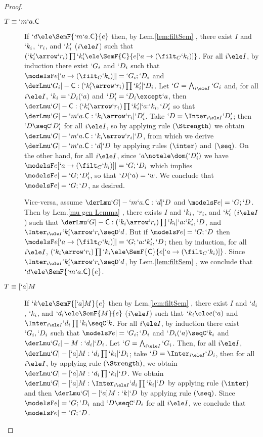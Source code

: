\documentclass{lmcs}
\begin{document}
\begin{proof}
\begin{description}
 \item [$ T\equiv `m`a.\textrm{\sf C} $] 
If $`d \ele \SemF { `m`a.\Cmd}{ e }$ then, by Lem.\skp\ref{lem:filtSem}%
, there exist $I$ and $`k_i$, $`r_i$, and $`k'_i$ ($i \ele I$) such that $(`k'_i\arrow `r_i)\prod `k'_i \ele \SemF { \Cmd}{ e[`a\to (\filt_C `k_i)] }$. 
For all $i \ele I$, by induction there exist $`G_i$ and $`D_i$ 
such that $\modelsF e[`a\to (\filt_C `k_i)] |= `G_i;`D_i$ and $ \derLmu `G_i |- {\Cmd} : (`k'_i\arrow `r_i)\prod `k'_i | `D_i $. 
Let $`G=\bigwedge_{i\ele I}`G_i$ and, for all $i \ele I$, $`k_i = `D_i(`a)$ and $`D'_i = `D_i\except`a$, then $ \derLmu `G |- {\Cmd} : (`k'_i\arrow `r_i)\prod `k'_i | `a{:}`k_i,`D'_i $ so that $ \derLmu `G |- `m`a.{\Cmd} : `k_i\arrow `r_i | `D'_i $. 
Take $`D = \Inter_{i \ele I} `D'_i$; then $`D\seqC `D'_i$ for all $i \ele I$, so by applying rule $(\Strength)$ we obtain $ \derLmu `G |- {`m`a.\Cmd} : `k_i\arrow `r_i | `D $, from which we derive $ \derLmu `G |- {`m`a.\Cmd} : `d | `D $ by applying rules $(\inter)$ and $(\seq)$.
On the other hand, for all $i \ele I$, since $`a\notele \dom(`D'_i)$ we have $\modelsF e[`a\to (\filt_C `k_i)] |= `G;`D_i$ which implies $\modelsF e |= `G;`D'_i$, so that $`D(`a) = `w$. We conclude that $\modelsF e |= `G;`D $, as desired.
	
Vice-versa, assume $ \derLmu `G |- {`m`a.\Cmd} : `d | `D $ and $\modelsF e |= `G;`D $.
Then by Lem.\skp\ref{mu gen Lemma}%
, there exists $I$ and $`k_i$, $`r_i$, and $`k'_i$ ($i \ele I$) such that $ \derLmu `G |- {\Cmd} : (`k_i\arrow `r_i)\prod `k_i | `a{:}`k'_i,`D $, and $\Inter_{i \ele I}`k'_i\arrow `r_i \seqD `d$. 
But if $\modelsF e |= `G;`D $ then $\modelsF e[`a\to (\filt_C `k_i)] |= `G;`a{:}`k'_i,`D $; 
then by induction, for all $i \ele I$, $(`k_i\arrow `r_i)\prod `k_i \ele \SemF { \Cmd}{ e[`a\to (\filt_C `k_i)] }$. 
Since $\Inter_{i \ele I}`k'_i\arrow `r_i \seqD `d$, by Lem.\skp\ref{lem:filtSem}%
, we conclude that $`d \ele \SemF { `m`a.\Cmd}{ e }$.
	
 \item [$ {T\equiv [`a]M} $] 
If $`k \ele \SemF { [`a]M}{ e }$ then by Lem.\skp\ref{lem:filtSem}%
, there exist $I$ and $`d_i$, $`k_i$, and $`d_i \ele \SemF { M }{ e }$ ($i \ele I$) such that $`k_i \ele e(`a)$ and $\Inter_{i \ele I}`d_i\prod `k_i \seqC `k$.
For all $i \ele I$, by induction there exist $`G_i,`D _i$ 
such that $\modelsF e |= `G_i;`D_i$ and $`D_i(`a) \seqC `k_i$ and $ \derLmu `G_i |- M : `d_i | `D_i $. Let $`G=\bigwedge_{i\ele I}`G_i$.
Then, for all $i \ele I$, $ \derLmu `G |- [`a]M : `d_i\prod `k_i | `D_i $; take $`D = \Inter_{i \ele I}`D_i$, then for all $i \ele I$, by applying rule $(\Strength)$, we obtain $ \derLmu `G |- [`a]M : `d_i\prod `k_i | `D $. 
We obtain $ \derLmu `G |- [`a]M : \Inter_{i \ele I}`d_i\prod `k_i | `D $ by applying rule $(\inter)$ and then $ \derLmu `G |- [`a]M : `k | `D $ by applying rule $(\seq)$. 
Since $\modelsF e |= `G;`D_i$ and $`D \seqC `D_i$ for all $i \ele I$, we conclude that $\modelsF e |= `G;`D $.
	

\end{description}
\end{proof}
\end{document}
